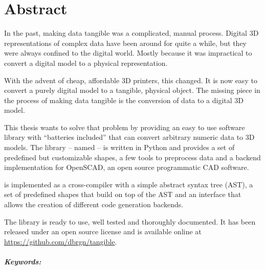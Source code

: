 

\begingroup
\let\clearpage\relax
\let\cleardoublepage\relax
\let\cleardoublepage\relax

\chapter*{Abstract} %

In the past, making data tangible was a complicated, manual process. Digital 3D
representations of complex data have been around for quite a while, but they
were always confined to the digital world. Mostly because it was impractical to
convert a digital model to a physical representation.

With the advent of cheap, affordable 3D printers, this changed. It is now easy
to convert a purely digital model to a tangible, physical object. The missing
piece in the process of making data tangible is the conversion of data to a
digital 3D model.

This thesis wants to solve that problem by providing an easy to use software
library with ``batteries included'' that can convert arbitrary numeric data to
3D models. The library -- named \tangible{} -- is written in Python and provides
a set of predefined but customizable shapes, a few tools to preprocess data and
a backend implementation for OpenSCAD, an open source programmatic CAD software.

\tangible{} is implemented as a cross-compiler with a simple abstract syntax
tree (AST), a set of predefined shapes that build on top of the AST and an
interface that allows the creation of different code generation backends.

The library is ready to use, well tested and thoroughly documented. It has been
released under an open source license and is available online at
\url{https://github.com/dbrgn/tangible}.

\endgroup			

\paragraph{Keywords:}\mbox{}\\
\textit{\myKeywords}

\vfill
